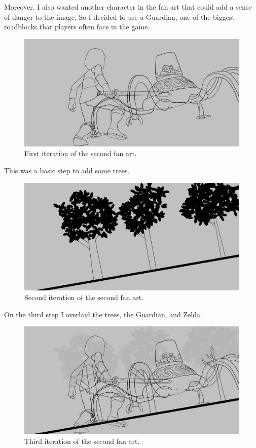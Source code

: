 \documentclass{cup-pan}
\begin{document}
        Moreover, I also wanted another character in the fan art that could add a sense of danger to the image. So I decided to use a Guardian, one of the biggest roadblocks that players often face in the game.\\

        \begin{figure}[H]
            \includegraphics[width=\textwidth]{Imagenes/Fanart2/Boceto_Lineart/I Iteracion_LineArt.png}
            \caption{First iteration of the second fan art.}
        \end{figure}

        This was a basic step to add some trees.
        \begin{figure}[H]
            \includegraphics[width=\textwidth]{Imagenes/Fanart2/Boceto_Lineart/II Iteracion_LineArt.png}
            \caption{Second iteration of the second fan art.}
        \end{figure}

        On the third step I overlaid the trees, the Guardian, and Zelda. 
        \begin{figure}[H]
            \includegraphics[width=\textwidth]{Imagenes/Fanart2/Boceto_Lineart/III Iteracion_2o_FanArt_LineArt.png}
            \caption{Third iteration of the second fan art.}
        \end{figure}
\end{document}
